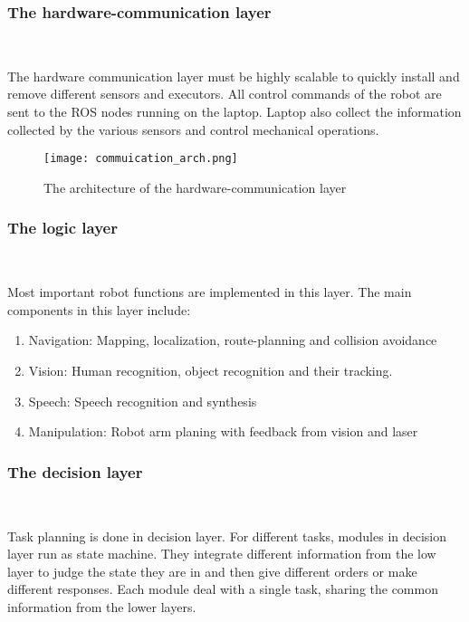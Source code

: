 \subsubsection{The hardware-communication layer}
\ 

The hardware communication layer must be highly scalable to quickly install and remove different sensors and executors. All control commands of the robot are sent to the ROS nodes running on the laptop. Laptop also collect the information collected by the various sensors and control mechanical operations.
\begin{figure}[!t]
	\centering
    \texttt{[image: commuication\_arch.png]}
    \caption{The architecture of the hardware-communication layer}
    \label{arch_comm}
\end{figure}

\subsubsection{The logic layer}
\ 

Most important robot functions are implemented in this layer. The main components in this layer include:
\begin{enumerate}
    \item Navigation: Mapping, localization, route-planning and collision avoidance
    \item Vision: Human recognition, object recognition and their tracking.
    \item Speech: Speech recognition and synthesis
    \item Manipulation: Robot arm planing with feedback from vision and laser
\end{enumerate}

\subsubsection{The decision layer}
\ 

Task planning is done in decision layer. For different tasks, modules in decision layer run as state machine. They integrate different information from the low layer to judge the state they are in and then give different orders or make different responses. Each module deal with a single task, sharing the common information from the lower layers.

